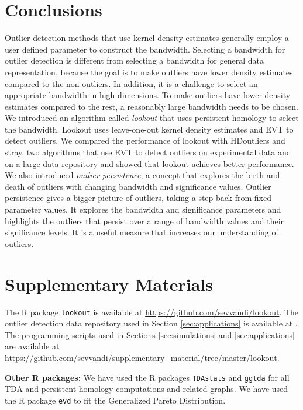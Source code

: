 \documentclass[11pt,a4paper,]{article}
\theoremstyle{definition}
\theoremstyle{definition}
\theoremstyle{definition}
\theoremstyle{remark}
\begin{document}
\hypertarget{conclusions}{%
\section{\texorpdfstring{Conclusions \label{sec:conclusions}}{Conclusions }}\label{conclusions}}

Outlier detection methods that use kernel density estimates generally employ a user defined parameter to construct the bandwidth. Selecting a bandwidth for outlier detection is different from selecting a bandwidth for general data representation, because the goal is to make outliers have lower density estimates compared to the non-outliers. In addition, it is a challenge to select an appropriate bandwidth in high dimensions. To make outliers have lower density estimates compared to the rest, a reasonably large bandwidth needs to be chosen. We introduced an algorithm called \emph{lookout} that uses persistent homology to select the bandwidth. Lookout uses leave-one-out kernel density estimates and EVT to detect outliers. We compared the performance of lookout with HDoutliers and stray, two algorithms that use EVT to detect outliers on experimental data and on a large data repository and showed that lookout achieves better performance.
We also introduced \emph{outlier persistence}, a concept that explores the birth and death of outliers with changing bandwidth and significance values. Outlier persistence gives a bigger picture of outliers, taking a step back from fixed parameter values. It explores the bandwidth and significance parameters and highlights the outliers that persist over a range of bandwidth values and their significance levels. It is a useful measure that increases our understanding of outliers.

\hypertarget{supplementary-materials}{%
\section{\texorpdfstring{Supplementary Materials \label{sec:suppmat}}{Supplementary Materials }}\label{supplementary-materials}}

The R package \texttt{lookout} is available at \url{https://github.com/sevvandi/lookout}.
The outlier detection data repository used in Section \ref{sec:applications} is available at \textcite{datasets}.
The programming scripts used in Sections \ref{sec:simulations} and \ref{sec:applications} are available at \url{https://github.com/sevvandi/supplementary_material/tree/master/lookout}.

\textbf{Other R packages:} We have used the R packages \texttt{TDAstats} \autocite{tdastatsR} and \texttt{ggtda} \autocite{ggdta} for all TDA and persistent homology computations and related graphs. We have used the R package \texttt{evd} \autocite{evdR} to fit the Generalized Pareto Distribution.

\printbibliography
\end{document}
